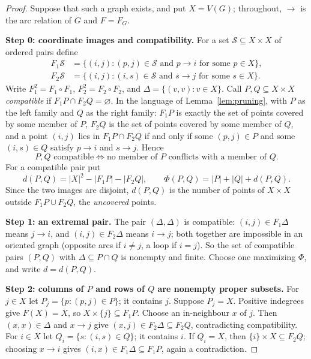 \documentclass[11pt]{article}
\theoremstyle{remark}
\newcommand{\abs}[1]{\lvert #1\rvert}
\newcommand{\Step}[1]{\par\medskip\noindent\textbf{#1}\enspace}
\begin{document}
\begin{proof}
Suppose that such a graph exists, and put $X=V(G)$; throughout, $\to$ is the
arc relation of $G$ and $F=F_G$.

\Step{Step 0: coordinate images and compatibility.}
For a set $\mathcal S\subseteq X\times X$ of ordered pairs define
\[
 \begin{aligned}
 F_1\mathcal S&=\{(i,j): (p,j)\in \mathcal S\text{ and }p\to i
                     \text{ for some }p\in X\},\\
 F_2\mathcal S&=\{(i,j): (i,s)\in \mathcal S\text{ and }s\to j
                     \text{ for some }s\in X\}.
 \end{aligned}
\]
Write $F_1^2=F_1\circ F_1$, $F_2^2=F_2\circ F_2$, and
$\Delta=\{(v,v):v\in X\}$. Call $P,Q\subseteq X\times X$ \emph{compatible}
if $F_1P\cap F_2Q=\varnothing$. In the language of Lemma~\ref{lem:pruning},
with $P$ as the left family and $Q$ as the right family: $F_1P$ is exactly
the set of points covered by some member of $P$, $F_2Q$ is the set of points
covered by some member of $Q$, and a point $(i,j)$ lies in $F_1P\cap F_2Q$
if and only if some $(p,j)\in P$ and some $(i,s)\in Q$ satisfy $p\to i$ and
$s\to j$. Hence
\begin{equation}\label{eq:compatible-iff}
 P,Q\text{ compatible}\iff\text{no member of }P\text{ conflicts with a
 member of }Q .
\end{equation}
For a compatible pair put
\[
 d(P,Q)=\abs{X}^2-\abs{F_1P}-\abs{F_2Q},
 \qquad \Phi(P,Q)=\abs P+\abs Q+d(P,Q).
\]
Since the two images are disjoint, $d(P,Q)$ is the number of points of
$X\times X$ outside $F_1P\cup F_2Q$, the \emph{uncovered} points.

\Step{Step 1: an extremal pair.}
The pair $(\Delta,\Delta)$ is compatible: $(i,j)\in F_1\Delta$ means
$j\to i$, and $(i,j)\in F_2\Delta$ means $i\to j$; both together are
impossible in an oriented graph (opposite arcs if $i\ne j$, a loop if
$i=j$). So the set of compatible pairs $(P,Q)$ with
$\Delta\subseteq P\cap Q$ is nonempty and finite. Choose one maximizing
$\Phi$, and write $d=d(P,Q)$.

\Step{Step 2: columns of $P$ and rows of $Q$ are nonempty proper subsets.}
For $j\in X$ let $P_j=\{p:(p,j)\in P\}$; it contains $j$. Suppose $P_j=X$.
Positive indegrees give $F(X)=X$, so $X\times\{j\}\subseteq F_1P$. Choose an
in-neighbour $x$ of $j$. Then $(x,x)\in\Delta$ and $x\to j$ give
$(x,j)\in F_2\Delta\subseteq F_2Q$, contradicting compatibility.
For $i\in X$ let $Q_i=\{s:(i,s)\in Q\}$; it contains $i$. If $Q_i=X$, then
$\{i\}\times X\subseteq F_2Q$; choosing $x\to i$ gives
$(i,x)\in F_1\Delta\subseteq F_1P$, again a contradiction.


\end{proof}
\end{document}

